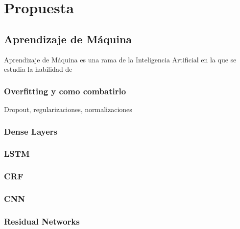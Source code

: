 \chapter{Propuesta}\label{chapter:proposal}



\section{Aprendizaje de Máquina}

Aprendizaje de Máquina es una rama de la Inteligencia Artificial en la que se estudia la habilidad de 

\subsection{Overfitting y como combatirlo}

Dropout, regularizaciones, normalizaciones

\subsection{Dense Layers}

\subsection{LSTM}

\subsection{CRF}

\subsection{CNN}

\subsection{Residual Networks}

